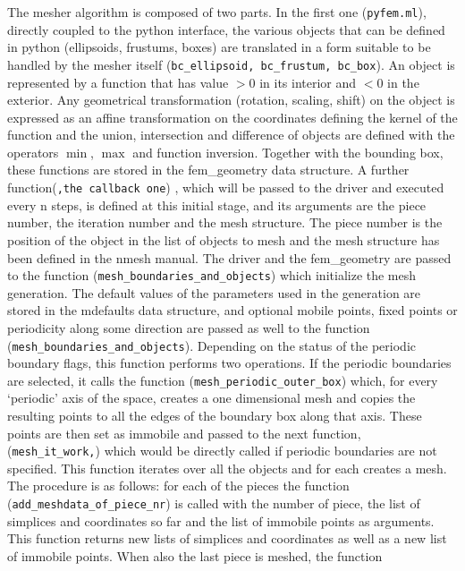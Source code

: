\documentclass[12pt,twoside]{article}
\newcommand{\om}[1]{(\texttt{#1})}
\begin{document}
The mesher algorithm is composed of two parts. In the first one
\om{pyfem.ml}, directly coupled to the python interface, the various
objects that can be defined in python (ellipsoids, frustums, boxes)
are translated in a form suitable to be handled by the mesher
itself \om{bc\_ellipsoid, bc\_frustum, bc\_box}. An object is
represented by a function that has value $> 0$ in its interior
and $< 0$ in the exterior. Any geometrical transformation
(rotation, scaling, shift) on the object is expressed as an affine
transformation on the coordinates defining the kernel of the function
and the union, intersection and difference of objects are defined with the
operators $\min$, $\max$ and function inversion. Together with the
bounding box, these functions are stored in the fem\_geometry
data structure. A further function\om{,the callback one} , which will
be passed to the driver and executed every n steps, is defined at this
initial stage, and its arguments are the piece number, the iteration
number and the mesh structure. The piece number is the position of the
object in the list of objects to mesh and the mesh structure has been
defined in the nmesh manual. The driver and the fem\_geometry are
passed to the function \om{mesh\_boundaries\_and\_objects} which
initialize the mesh generation. The default values of the parameters used in the
generation are stored in the mdefaults data structure, and optional
mobile points, fixed points or periodicity along some direction are
passed as well to the function \om{mesh\_boundaries\_and\_objects}.
Depending on the status of the periodic boundary flags, this function
performs two operations. If the periodic boundaries are selected, it
calls the function \om{mesh\_periodic\_outer\_box} which, for every
`periodic' axis of the space, creates a one dimensional mesh and
copies the resulting points to all the edges of the boundary box
along that axis. These points are then set as immobile and passed to the
next function, \om{mesh\_it\_work,} which would be directly called if
periodic boundaries are not specified. This function iterates over all
the objects and for each creates a mesh. The procedure is as follows:
for each of the pieces the function \om{add\_meshdata\_of\_piece\_nr} is
called with the number of piece, the list of simplices and coordinates
so far and the list of immobile points as arguments. This function
returns new lists of simplices and coordinates as well as a new list
of immobile points. When also the last piece is meshed, the function
\end{document}
